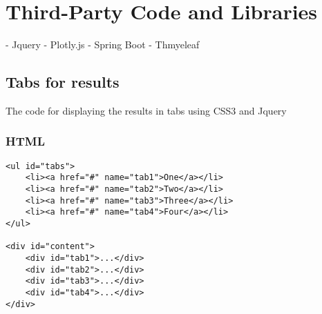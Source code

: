 \chapter{Third-Party Code and Libraries}





- Jquery
- Plotly.js
- Spring Boot
- Thmyeleaf

\section{Tabs for results}
The code for displaying the results in tabs using CSS3 and Jquery\cite{tabcode}
\subsection{HTML}
\begin{verbatim}
<ul id="tabs">
    <li><a href="#" name="tab1">One</a></li>
    <li><a href="#" name="tab2">Two</a></li>
    <li><a href="#" name="tab3">Three</a></li>
    <li><a href="#" name="tab4">Four</a></li>    
</ul>

<div id="content"> 
    <div id="tab1">...</div>
    <div id="tab2">...</div>
    <div id="tab3">...</div>
    <div id="tab4">...</div>
</div>
\end{verbatim}
